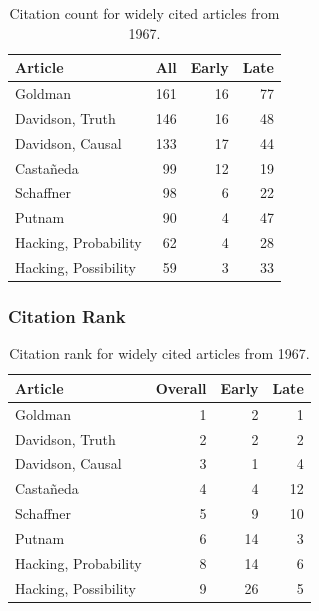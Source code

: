 \documentclass[
  10pt,
  letterpaper,
  DIV=11,
  numbers=noendperiod,
  twoside]{scrartcl}
\begin{document}
\begin{longtable}[]{@{}lrrr@{}}

\caption{\label{tbl-citation-count-1967}Citation count for widely cited
articles from 1967.}

\tabularnewline

\toprule\noalign{}
Article & All & Early & Late \\
\midrule\noalign{}
\endhead
\bottomrule\noalign{}
\endlastfoot
Goldman & 161 & 16 & 77 \\
Davidson, Truth & 146 & 16 & 48 \\
Davidson, Causal & 133 & 17 & 44 \\
Castañeda & 99 & 12 & 19 \\
Schaffner & 98 & 6 & 22 \\
Putnam & 90 & 4 & 47 \\
Hacking, Probability & 62 & 4 & 28 \\
Hacking, Possibility & 59 & 3 & 33 \\

\end{longtable}

\subsubsection*{Citation Rank}\label{sec-rank-1967}

\begin{longtable}[]{@{}lrrr@{}}

\caption{\label{tbl-citation-rank-1967}Citation rank for widely cited
articles from 1967.}

\tabularnewline

\toprule\noalign{}
Article & Overall & Early & Late \\
\midrule\noalign{}
\endhead
\bottomrule\noalign{}
\endlastfoot
Goldman & 1 & 2 & 1 \\
Davidson, Truth & 2 & 2 & 2 \\
Davidson, Causal & 3 & 1 & 4 \\
Castañeda & 4 & 4 & 12 \\
Schaffner & 5 & 9 & 10 \\
Putnam & 6 & 14 & 3 \\
Hacking, Probability & 8 & 14 & 6 \\
Hacking, Possibility & 9 & 26 & 5 \\

\end{longtable}
\end{document}
